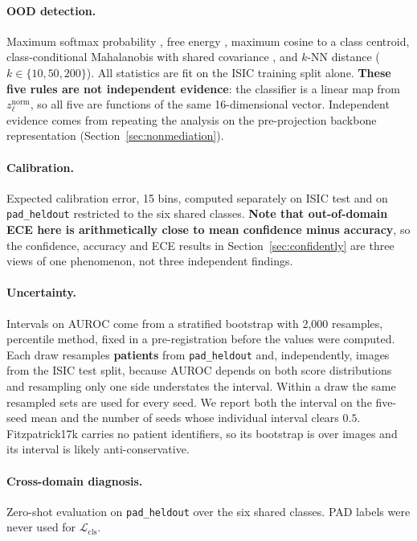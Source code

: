 \documentclass[11pt,a4paper]{article}
\begin{document}
\paragraph{OOD detection.} Maximum softmax probability \cite{hendrycks2017},
free energy \cite{liu2020}, maximum cosine to a class centroid,
class-conditional Mahalanobis with shared covariance \cite{lee2018}, and $k$-NN
distance \cite{sun2022} ($k \in \{10,50,200\}$). All statistics are fit on the ISIC training
split alone. \textbf{These five rules are not independent evidence}: the
classifier is a linear map from $z_{\ell}^{\mathrm{norm}}$, so all five are
functions of the same 16-dimensional vector. Independent evidence comes from
repeating the analysis on the pre-projection backbone representation
(Section~\ref{sec:nonmediation}).

\paragraph{Calibration.} Expected calibration error, 15 bins, computed
separately on ISIC test and on \texttt{pad\_heldout} restricted to the six
shared classes. \textbf{Note that out-of-domain ECE here is arithmetically
close to mean confidence minus accuracy}, so the confidence, accuracy and ECE
results in Section~\ref{sec:confidently} are three views of one phenomenon,
not three independent findings.

\paragraph{Uncertainty.} Intervals on AUROC come from a stratified bootstrap with
2{,}000 resamples, percentile method, fixed in a pre-registration before the values
were computed. Each draw resamples \textbf{patients} from \texttt{pad\_heldout} and,
independently, images from the ISIC test split, because AUROC depends on both score
distributions and resampling only one side understates the interval. Within a draw the
same resampled sets are used for every seed. We report both the interval on the
five-seed mean and the number of seeds whose individual interval clears $0.5$.
Fitzpatrick17k carries no patient identifiers, so its bootstrap is over images and its
interval is likely anti-conservative.

\paragraph{Cross-domain diagnosis.} Zero-shot evaluation on
\texttt{pad\_heldout} over the six shared classes. PAD labels were never used
for $\mathcal{L}_{\mathrm{cls}}$.
\end{document}
